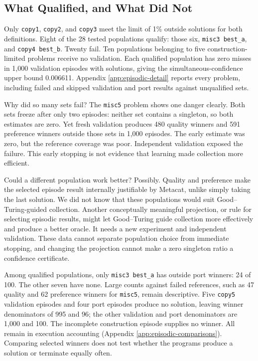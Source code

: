 \documentclass[10pt,letterpaper]{article}
\begin{document}
\subsection{What Qualified, and What Did Not}\label{sec:main-coverage-results}

Only \texttt{copy1}, \texttt{copy2}, and \texttt{copy3} meet the limit of 1\% outside
solutions for both definitions. Eight of the 28 tested populations qualify: those six,
\texttt{misc3\ best\_a}, and \texttt{copy4\ best\_b}. Twenty fail. Ten populations
belonging to five construction-limited problems receive no validation. Each qualified
population has zero misses in 1,000 validation episodes with solutions, giving the
simultaneous-confidence upper bound 0.006611. Appendix \ref{app:episodic-detail} reports
every problem, including failed and skipped validation and port results against
unqualified sets.

Why did so many sets fail? The \texttt{misc5} problem shows one danger clearly. Both sets
freeze after only two episodes: neither set contains a singleton, so both estimates are
zero. Yet fresh validation produces 480 quality winners and 591 preference winners outside
those sets in 1,000 episodes. The early estimate was zero, but the reference coverage was
poor. Independent validation exposed the failure. This early stopping is not evidence that
learning made collection more efficient.

Could a different population work better? Possibly. Quality and preference make the
selected episode result internally justifiable by Metacat, unlike simply taking the last
solution. We did not know that these populations would suit Good--Turing-guided
collection. Another conceptually meaningful projection, or rule for selecting episodic
results, might let Good--Turing guide collection more effectively and produce a better
oracle. It needs a new experiment and independent validation. These data cannot separate
population choice from immediate stopping, and changing the projection cannot make a zero
singleton ratio a confidence certificate.

Among qualified populations, only \texttt{misc3\ best\_a} has outside port winners: 24 of
100. The other seven have none. Large counts against failed references, such as 47 quality
and 62 preference winners for \texttt{misc5}, remain descriptive. Five \texttt{copy5}
validation episodes and four port episodes produce no solution, leaving winner
denominators of 995 and 96; the other validation and port denominators are 1,000 and 100.
The incomplete construction episode supplies no winner. All remain in execution accounting
(Appendix \ref{app:episodic-comparisons}). Comparing selected winners does not test
whether the programs produce a solution or terminate equally often.
\end{document}
